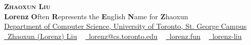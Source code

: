 \documentclass[letterpaper,11pt]{article}
\begin{document}

\begin{center}
    {\Huge \scshape \textbf{Zhaoxun Liu}} \\ \vspace{5pt}
    {\Large \textbf{Lorenz}} {\textbf{O}ften \textbf{R}epresents the \textbf{E}nglish \textbf{N}ame for \textbf{Z}haoxun} \\ \vspace{5pt}
    \href{https://web.cs.toronto.edu/}{Department of Computer Science, University of Toronto, St. George Campus} \\ \vspace{2pt}
    \small \href{https://www.linkedin.com/in/zhaoxun-lorenz-liu/}{\raisebox{-0.1\height}\faLinkedin\ Zhaoxun (Lorenz) Liu} ~ \href{mailto:lorenz@cs.toronto.edu}{\raisebox{-0.2\height}\faEnvelope\  {lorenz@cs.toronto.edu}} ~
    \href{https://lorenz.fun/}{\raisebox{-0.2\height}\faHome\ {lorenz.fun}}  ~
    \href{https://github.com/lorenz-liu}{\raisebox{-0.2\height}\faGithub\ {lorenz-liu}}
    \vspace{-8pt}
\end{center}


\end{document}
